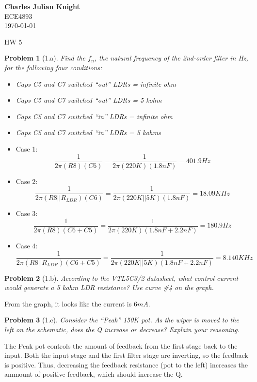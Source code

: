 \documentclass[12pt]{article}
\newtheorem*{prob}{Problem}
\begin{document}
\begin{flushright}
\textbf{Charles Julian Knight}\\
ECE4893\\
\today
\end{flushright}


\begin{center}
\huge HW 5
\end{center}

\begin{prob}[1.a]{
Find the $f_n$, the natural frequency of the 2nd-order filter in Hz, for the following four conditions:
\begin{itemize}
  \item Caps C5 and C7 switched ``out'' LDRs = infinite ohm
  \item Caps C5 and C7 switched ``out'' LDRs = 5 kohm
  \item Caps C5 and C7 switched ``in'' LDRs = infinite ohm
  \item Caps C5 and C7 switched ``in'' LDRs = 5 kohms
\end{itemize}
}\end{prob}
\begin{itemize}
  \item Case 1: 
    \[ \frac{1}{2\pi (R8)(C6)} = \frac{1}{2\pi (220K) (1.8nF)} = 401.9 Hz \]
  \item Case 2:
    \[ \frac{1}{2\pi (R8||R_{LDR})(C6)} = \frac{1}{2\pi (220K||5K) (1.8nF)} = 18.09 KHz \]
  \item Case 3:
    \[ \frac{1}{2\pi (R8)(C6+C5)} = \frac{1}{2\pi (220K) (1.8nF+2.2nF)} = 180.9 Hz \]
  \item Case 4:
    \[ \frac{1}{2\pi (R8||R_{LDR})(C6+C5)} = \frac{1}{2\pi (220K||5K) (1.8nF+2.2nF)} = 8.140 KHz \]
\end{itemize}

\begin{prob}[1.b]{
  According to the VTL5C3/2 datasheet, what control current would generate a 5 kohm LDR resistance? Use curve \#4 on the graph.
}\end{prob}
From the graph, it looks like the current is $6mA$.
\begin{prob}[1.c]{
  Consider the ``Peak'' 150K pot. As the wiper is moved to the left on the schematic, does the Q increase or decrease? Explain your reasoning.
}\end{prob}
  The Peak pot controls the amount of feedback from the first stage back to the input. Both the input stage and the first filter stage are inverting, so the feedback is positive. Thus, decreasing the feedback resistance (pot to the left) increases the ammount of positive feedback, which should increase the Q. 
\end{document}
